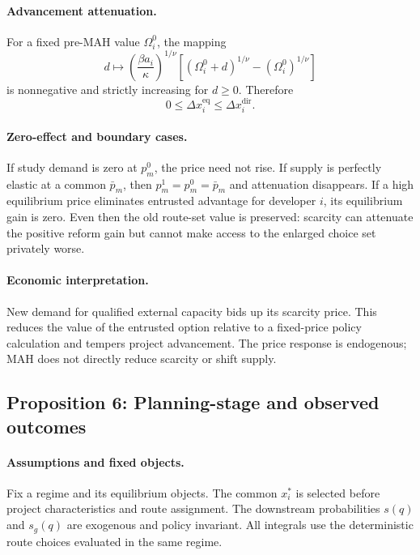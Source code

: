 \paragraph{Advancement attenuation.}
For a fixed pre-MAH value \(\Omega_i^0\), the mapping
\[
  d\longmapsto
  \left(\frac{\beta a_i}{\kappa}\right)^{1/\nu}
  [(\Omega_i^0+d)^{1/\nu}-(\Omega_i^0)^{1/\nu}]
\]
is nonnegative and strictly increasing for \(d\geq0\). Therefore
\begin{equation}
  0
  \leq
  \Delta x_i^{\mathrm{eq}}
  \leq
  \Delta x_i^{\mathrm{dir}}.
  \label{eq:p08-scarcity-advancement-bounds}
\end{equation}

\paragraph{Zero-effect and boundary cases.}
If study demand is zero at \(p_m^0\), the price need not rise. If supply is
perfectly elastic at a common \(\bar p_m\), then
\(p_m^1=p_m^0=\bar p_m\) and attenuation disappears. If a high equilibrium
price eliminates entrusted advantage for developer \(i\), its equilibrium
gain is zero. Even then the old route-set value is preserved: scarcity can
attenuate the positive reform gain but cannot make access to the enlarged
choice set privately worse.

\paragraph{Economic interpretation.}
New demand for qualified external capacity bids up its scarcity price. This
reduces the value of the entrusted option relative to a fixed-price policy
calculation and tempers project advancement. The price response is endogenous;
MAH does not directly reduce scarcity or shift supply.

\subsection{Proposition 6: Planning-stage and observed outcomes}
\label{prop:p08-outcomes}

\paragraph{Assumptions and fixed objects.}
Fix a regime and its equilibrium objects. The common \(x_i^*\) is selected
before project characteristics and route assignment. The downstream
probabilities \(s(q)\) and \(s_g(q)\) are exogenous and policy invariant.
All integrals use the deterministic route choices evaluated in the same
regime.

